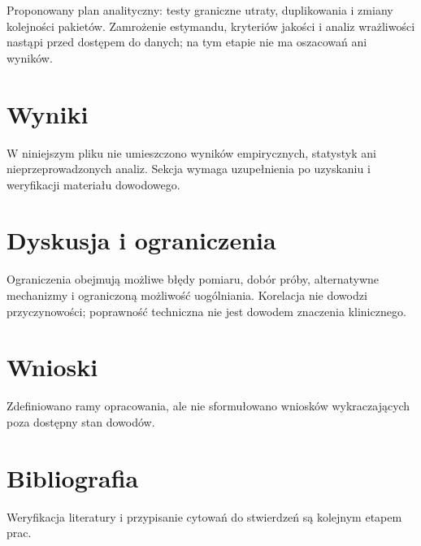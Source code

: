 \documentclass[11pt,a4paper]{article}
\begin{document}
Proponowany plan analityczny: testy graniczne utraty, duplikowania i zmiany kolejności pakietów. Zamrożenie estymandu, kryteriów jakości i analiz wrażliwości nastąpi przed dostępem do danych; na tym etapie nie ma oszacowań ani wyników.

\section{Wyniki}

W niniejszym pliku nie umieszczono wyników empirycznych, statystyk ani nieprzeprowadzonych analiz. Sekcja wymaga uzupełnienia po uzyskaniu i weryfikacji materiału dowodowego.

\section{Dyskusja i ograniczenia}

Ograniczenia obejmują możliwe błędy pomiaru, dobór próby, alternatywne mechanizmy i ograniczoną możliwość uogólniania. Korelacja nie dowodzi przyczynowości; poprawność techniczna nie jest dowodem znaczenia klinicznego.

\section{Wnioski}

Zdefiniowano ramy opracowania, ale nie sformułowano wniosków wykraczających poza dostępny stan dowodów.

\section*{Bibliografia}

Weryfikacja literatury i przypisanie cytowań do stwierdzeń są kolejnym etapem prac.
\end{document}
